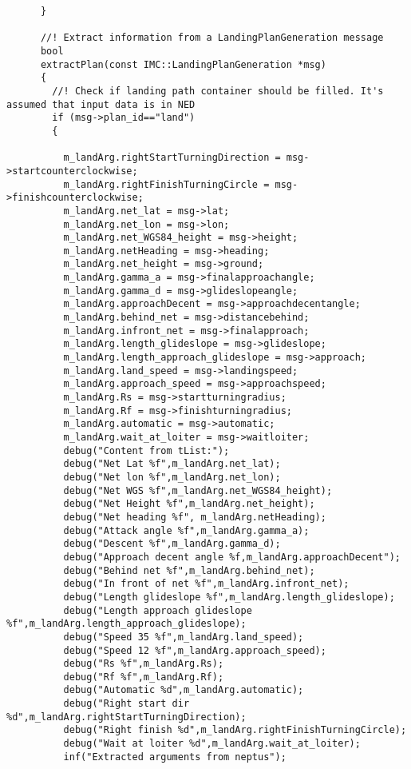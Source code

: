 \begin{frame}[fragile]
\begin{lstlisting}
      }

      //! Extract information from a LandingPlanGeneration message
      bool
      extractPlan(const IMC::LandingPlanGeneration *msg)
      {
        //! Check if landing path container should be filled. It's assumed that input data is in NED
        if (msg->plan_id=="land")
        {

          m_landArg.rightStartTurningDirection = msg->startcounterclockwise;
          m_landArg.rightFinishTurningCircle = msg->finishcounterclockwise;
          m_landArg.net_lat = msg->lat;
          m_landArg.net_lon = msg->lon;
          m_landArg.net_WGS84_height = msg->height;
          m_landArg.netHeading = msg->heading;
          m_landArg.net_height = msg->ground;
          m_landArg.gamma_a = msg->finalapproachangle;
          m_landArg.gamma_d = msg->glideslopeangle;
          m_landArg.approachDecent = msg->approachdecentangle;
          m_landArg.behind_net = msg->distancebehind;
          m_landArg.infront_net = msg->finalapproach;
          m_landArg.length_glideslope = msg->glideslope;
          m_landArg.length_approach_glideslope = msg->approach;
          m_landArg.land_speed = msg->landingspeed;
          m_landArg.approach_speed = msg->approachspeed;
          m_landArg.Rs = msg->startturningradius;
          m_landArg.Rf = msg->finishturningradius;
          m_landArg.automatic = msg->automatic;
          m_landArg.wait_at_loiter = msg->waitloiter;
          debug("Content from tList:");
          debug("Net Lat %f",m_landArg.net_lat);
          debug("Net lon %f",m_landArg.net_lon);
          debug("Net WGS %f",m_landArg.net_WGS84_height);
          debug("Net Height %f",m_landArg.net_height);
          debug("Net heading %f", m_landArg.netHeading);
          debug("Attack angle %f",m_landArg.gamma_a);
          debug("Descent %f",m_landArg.gamma_d);
          debug("Approach decent angle %f,m_landArg.approachDecent");
          debug("Behind net %f",m_landArg.behind_net);
          debug("In front of net %f",m_landArg.infront_net);
          debug("Length glideslope %f",m_landArg.length_glideslope);
          debug("Length approach glideslope %f",m_landArg.length_approach_glideslope);
          debug("Speed 35 %f",m_landArg.land_speed);
          debug("Speed 12 %f",m_landArg.approach_speed);
          debug("Rs %f",m_landArg.Rs);
          debug("Rf %f",m_landArg.Rf);
          debug("Automatic %d",m_landArg.automatic);
          debug("Right start dir %d",m_landArg.rightStartTurningDirection);
          debug("Right finish %d",m_landArg.rightFinishTurningCircle);
          debug("Wait at loiter %d",m_landArg.wait_at_loiter);
          inf("Extracted arguments from neptus");


\end{lstlisting}
\end{frame}
